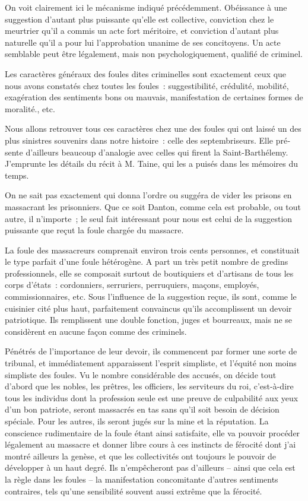 \documentclass[french,twoside]{book} %
\begin{document}
On voit clairement ici le mécanisme indiqué précédemment. Obéissance à une suggestion d’autant plus puissante qu’elle est collective, conviction chez le meurtrier qu’il a commis un acte fort méritoire, et conviction d’autant plus naturelle qu’il a pour lui l’approbation unanime de ses concitoyens. Un acte semblable peut être légalement, mais non psychologiquement, qualifié de criminel.\par
Les caractères généraux des foules dites criminelles sont exactement ceux que nous avons constatés chez toutes les foules : suggestibilité, crédulité, mobilité, exagé­ration des sentiments bons ou mauvais, manifestation de certaines formes de moralité., etc.\par
Nous allons retrouver tous ces caractères chez une des foules qui ont laissé un des plus sinistres souvenirs dans notre histoire : celle des septembriseurs. Elle pré­sente d’ailleurs beaucoup d’analogie avec celles qui firent la Saint-Barthélemy. J’emprunte les détails du récit à M. Taine, qui les a puisés dans les mémoires du temps.\par
On ne sait pas exactement qui donna l’ordre ou suggéra de vider les prisons en massacrant les prisonniers. Que ce soit Danton, comme cela est probable, ou tout autre, il n’importe ; le seul fait intéressant pour nous est celui de la suggestion puis­sante que reçut la foule chargée du massacre.\par
La foule des massacreurs comprenait environ trois cents personnes, et constituait le type parfait d’une foule hétérogène. A part un très petit nombre de gredins profes­sionnels, elle se composait surtout de boutiquiers et d’artisans de tous les corps d’états : cordonniers, serruriers, perruquiers, maçons, employés, commissionnaires, etc. Sous l’influence de la suggestion reçue, ils sont, comme le cuisinier cité plus haut, parfaitement convaincus qu’ils accomplissent un devoir patriotique. Ils remplissent une double fonction, juges et bourreaux, mais ne se considèrent en aucune façon com­me des criminels.\par
Pénétrés de l’importance de leur devoir, ils commencent par former une sorte de tribunal, et immédiatement apparaissent l’esprit simpliste, et l’équité non moins sim­pliste des foules. Vu le nombre considérable des accusés, on décide tout d’abord que les nobles, les prêtres, les officiers, les serviteurs du roi, c’est-à-dire tous les individus dont la profession seule est une preuve de culpabilité aux yeux d’un bon patriote, seront massacrés en tas sans qu’il soit besoin de décision spéciale. Pour les autres, ils seront jugés sur la mine et la réputation. La conscience rudimentaire de la foule étant ainsi satisfaite, elle va pouvoir procéder légalement au massacre et donner libre cours à ces instincts de férocité dont j’ai montré ailleurs la genèse, et que les collectivités ont toujours le pouvoir de développer à un haut degré. Ils n’empêcheront pas d’ailleurs – ainsi que cela est la règle dans les foules – la manifestation concomitante d’autres sentiments contraires, tels qu’une sensibilité souvent aussi extrême que la férocité.\par
\end{document}
